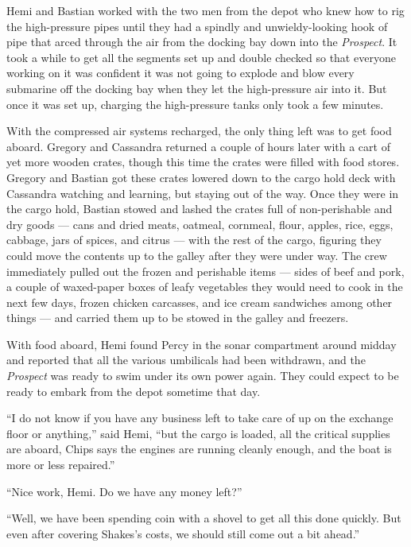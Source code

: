 \documentclass[
]{scrbook}
\begin{document}
Hemi and Bastian worked with the two men from the depot who knew how to
rig the high-pressure pipes until they had a spindly and
unwieldy-looking hook of pipe that arced through the air from the
docking bay down into the \emph{Prospect}. It took a while to get all
the segments set up and double checked so that everyone working on it
was confident it was not going to explode and blow every submarine off
the docking bay when they let the high-pressure air into it. But once it
was set up, charging the high-pressure tanks only took a few minutes.

With the compressed air systems recharged, the only thing left was to
get food aboard. Gregory and Cassandra returned a couple of hours later
with a cart of yet more wooden crates, though this time the crates were
filled with food stores. Gregory and Bastian got these crates lowered
down to the cargo hold deck with Cassandra watching and learning, but
staying out of the way. Once they were in the cargo hold, Bastian stowed
and lashed the crates full of non-perishable and dry goods --- cans and
dried meats, oatmeal, cornmeal, flour, apples, rice, eggs, cabbage, jars
of spices, and citrus --- with the rest of the cargo, figuring they
could move the contents up to the galley after they were under way. The
crew immediately pulled out the frozen and perishable items --- sides of
beef and pork, a couple of waxed-paper boxes of leafy vegetables they
would need to cook in the next few days, frozen chicken carcasses, and
ice cream sandwiches among other things --- and carried them up to be
stowed in the galley and freezers.

\bigskip

With food aboard, Hemi found Percy in the sonar compartment around
midday and reported that all the various umbilicals had been withdrawn,
and the \emph{Prospect} was ready to swim under its own power again.
They could expect to be ready to embark from the depot sometime that
day.

``I do not know if you have any business left to take care of up on the
exchange floor or anything,'' said Hemi, ``but the cargo is loaded, all
the critical supplies are aboard, Chips says the engines are running
cleanly enough, and the boat is more or less repaired.''

``Nice work, Hemi. Do we have any money left?''

``Well, we have been spending coin with a shovel to get all this done
quickly. But even after covering Shakes's costs, we should still come
out a bit ahead.''
\end{document}

